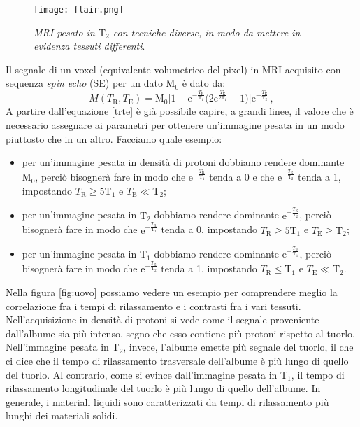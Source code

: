 \documentclass{report}
\newcommand{\figref}[1]{figura \ref{#1}}
\renewcommand{\eqref}[1]{equazione \ref{#1}}
\numberwithin{equation}{section}
\numberwithin{figure}{section}
\begin{document}
\begin{figure}[htp]
\centering
\texttt{[image: flair.png]}
\caption{\label{fig:flair} \textit{MRI pesato in $\mathrm{T_2}$ con tecniche diverse, in modo da mettere in evidenza tessuti differenti}.}
\end{figure}

Il segnale di un voxel (equivalente volumetrico del pixel) in MRI acquisito con sequenza \textit{spin echo} (SE) per un dato $\mathrm{M}_0$ è dato da:
\begin{equation}
    M(T_\mathrm{R},T_\mathrm{E})= \mathrm{M}_0 \Big[1-\mathrm{e}^{-\frac{T_\mathrm{R}}{\mathrm{T_1}}} \Big(2\mathrm{e}^{\frac{T_\mathrm{E}}{2\mathrm{T_1}}}-1 \Big) \Big]\mathrm{e}^{-\frac{T_\mathrm{E}}{\mathrm{T_2}}}\,,
    \label{trte}
\end{equation}
A partire dall'\eqref{trte} è già possibile capire, a grandi linee, il valore che è necessario assegnare ai parametri per ottenere un'immagine pesata in un modo piuttosto che in un altro. Facciamo quale esempio:
\begin{itemize}[label=$-$]
    \item per un'immagine pesata in densità di protoni dobbiamo rendere dominante $\mathrm{M_0}$, perciò bisognerà fare in modo che $\mathrm{e}^{-\frac{T_\mathrm{R}}{\mathrm{T_1}}}$ tenda a 0 e che $\mathrm{e}^{-\frac{T_\mathrm{E}}{\mathrm{T_2}}}$ tenda a 1, impostando $T_\mathrm{R} \geq 5\mathrm{T_1}$ e $T_\mathrm{E} \ll \mathrm{T_2}$;
    \item per un'immagine pesata in $\mathrm{T_2}$ dobbiamo rendere dominante $\mathrm{e}^{-\frac{T_\mathrm{E}}{\mathrm{T_2}}}$, perciò bisognerà fare in modo che $\mathrm{e}^{-\frac{T_\mathrm{R}}{\mathrm{T_1}}}$ tenda a 0, impostando $T_\mathrm{R} \geq 5\mathrm{T_1}$ e $T_\mathrm{E} \geq \mathrm{T_2}$;
    \item per un'immagine pesata in $\mathrm{T_1}$ dobbiamo rendere dominante $\mathrm{e}^{-\frac{T_\mathrm{R}}{\mathrm{T_1}}}$, perciò bisognerà fare in modo che $\mathrm{e}^{-\frac{T_\mathrm{E}}{\mathrm{T_2}}}$ tenda a 1, impostando $T_\mathrm{R} \leq \mathrm{T_1}$ e $T_\mathrm{E} \ll \mathrm{T_2}$.
\end{itemize}

Nella \figref{fig:uovo} possiamo vedere un esempio per comprendere meglio la correlazione fra i tempi di rilassamento e i contrasti fra i vari tessuti. Nell'acquisizione in densità di protoni si vede come il segnale proveniente dall'albume sia più intenso, segno che esso contiene più protoni rispetto al tuorlo. Nell'immagine pesata in $\mathrm{T_2}$, invece, l'albume emette più segnale del tuorlo, il che ci dice che il tempo di rilassamento trasversale dell'albume è più lungo di quello del tuorlo. Al contrario, come si evince dall'immagine pesata in $\mathrm{T_1}$, il tempo di rilassamento longitudinale del tuorlo è più lungo di quello dell'albume. In generale, i materiali liquidi sono caratterizzati da tempi di rilassamento più lunghi dei materiali solidi.
\end{document}
